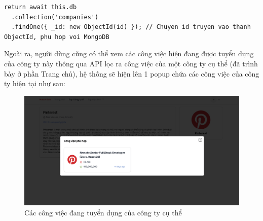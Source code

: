 \begin{lstlisting}
return await this.db
  .collection('companies')
  .findOne({ _id: new ObjectId(id) }); // Chuyen id truyen vao thanh ObjectId, phu hop voi MongoDB
\end{lstlisting}

Ngoài ra, người dùng cũng có thể xem các công việc hiện đang được tuyển dụng của công ty này thông qua API lọc ra công việc của một công ty cụ thể (đã trình bày ở phần Trang chủ), hệ thống sẽ hiện lên 1 popup chứa các công việc của công ty hiện tại như sau:

\begin{figure}[H]
    \centering
    \includegraphics[width=\linewidth]{DBMS-Application/Images/modal-job-in-company-detail.png}
    \caption{Các công việc đang tuyển dụng của công ty cụ thể}
    \label{fig:enter-label}
\end{figure}


